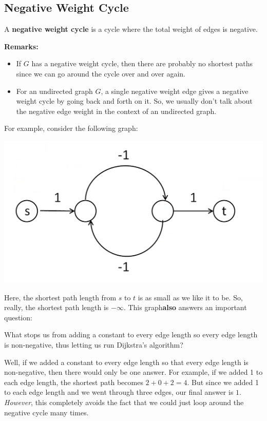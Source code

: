 \documentclass[letterpaper]{article}
\begin{document}
\subsection{Negative Weight Cycle}
\begin{definition}{}{}
    A \textbf{negative weight cycle} is a cycle where the total weight of edges is negative. 
\end{definition}
\textbf{Remarks:}
\begin{itemize}
    \item If $G$ has a negative weight cycle, then there are probably no shortest paths since we can go around the cycle over and over again. 
    \item For an undirected graph $G$, a single negative weight edge gives a negative weight cycle by going back and forth on it. So, we usually don't talk about the negative edge weight in the context of an undirected graph. 
\end{itemize}
For example, consider the following graph:
\begin{center}
    \includegraphics[scale=0.2]{../assets/neg_cycle_1.png}
\end{center}
Here, the shortest path length from $s$ to $t$ is as small as we like it to be. So, really, the shortest path length is $-\infty$. This graph\textbf{also} answers an important question:
\begin{mdframed}[]
    What stops us from adding a constant to every edge length so every edge length is non-negative, thus letting us run Dijkstra's algorithm? 
\end{mdframed}
Well, if we added a constant to every edge length so that every edge length is non-negative, then there would only be one answer. For example, if we added 1 to each edge length, the shortest path becomes $2 + 0 + 2 = 4$. But since we added 1 to each edge length and we went through three edges, our final answer is $1$. \emph{However}, this completely avoids the fact that we could just loop around the negative cycle many times. 
\end{document}
